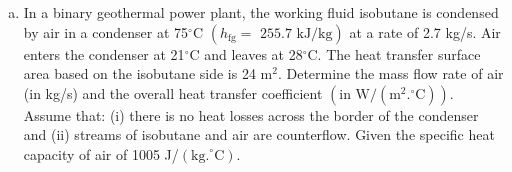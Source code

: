 \documentclass[calculator,datasheet,handbook,solutions]{exam}
\begin{document}

\begin{question}
  \begin{enumerate}[a)]
     \item In a binary geothermal power plant, the working fluid isobutane is condensed by air in a condenser at 75$^{\circ}$C $\left(h_{\text{fg}}=\text{ 255.7 kJ/kg}\right)$ at a rate of 2.7 kg/s. Air enters the condenser at 21$^{\circ}$C and leaves at 28$^{\circ}$C. The heat transfer surface area based on the isobutane side is 24 m$^{2}$. Determine the mass flow rate of air (in kg/s) and the overall heat transfer coefficient $\left(\text{in W/}\left(\text{m}^{2}.^{\circ}\text{C}\right)\right)$. Assume that: (i) there is no heat losses across the border of the condenser and (ii) streams of isobutane and air are counterflow. Given the specific heat capacity of air of 1005 J/$\left(\text{kg.}^{\circ}\text{C}\right)$.
\end{enumerate}
\end{question}
\end{document}
